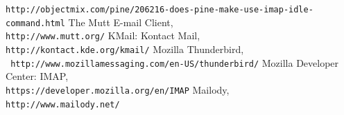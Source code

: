 \documentclass[12pt,notitlepage]{report}
\begin{document}
\begin{thebibliography}{99}
        {\tt http://objectmix.com/pine/206216-does-pine-make-use-imap-idle-command.html}
    The Mutt E-mail Client, \\
        {\tt http://www.mutt.org/}
    KMail: Kontact Mail, \\{\tt http://kontact.kde.org/kmail/}
    Mozilla Thunderbird, \\{\tt
        http://www.mozillamessaging.com/en-US/thunderbird/}
    Mozilla Developer Center: IMAP, \\
        {\tt https://developer.mozilla.org/en/IMAP}
    Mailody, \\{\tt http://www.mailody.net/}
\end{thebibliography}
\end{document}
